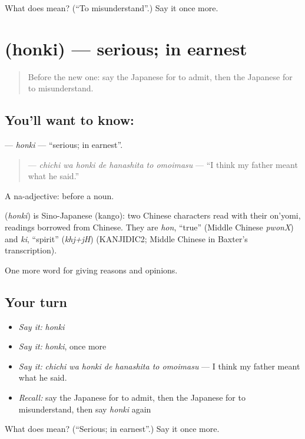 \begin{tcolorbox}[breakable,colback=teal!4,colframe=teal!35!black,title={Before you move on}]
What does  mean? (\textquotedblleft{}To misunderstand\textquotedblright{}.) Say it once more.
\end{tcolorbox}
\section[\texorpdfstring{\ja{ほんき} (honki)}{ほんき (honki)}]{ (honki) — serious; in earnest}

\label{lesson:JA-C319-honki}



\begin{quote}
Before the new one: say the Japanese for to admit, then the Japanese for to misunderstand.
\end{quote}

\subsection*{You'll want to know: }
\textbf{} — \emph{honki} — \textquotedblleft{}serious; in earnest\textquotedblright{}.

\begin{quote}
\textbf{   } — \emph{chichi wa honki de hanashita to omoimasu} — \textquotedblleft{}I think my father meant what he said.\textquotedblright{}
\end{quote}

A na-adjective:  before a noun.

\begin{cousinweb}
\textbf{} (\emph{honki}) is Sino-Japanese (kango): two Chinese characters read with their on'yomi, readings borrowed from Chinese. They are \emph{hon}, \textquotedblleft{}true\textquotedblright{} (Middle Chinese \emph{pwonX}) and \emph{ki}, \textquotedblleft{}spirit\textquotedblright{} (\emph{khj+jH}) (KANJIDIC2; Middle Chinese in Baxter's transcription).
\end{cousinweb}

\begin{grammarlens}[title={What you've built}]
One more word for giving reasons and opinions.
\end{grammarlens}

\subsection*{Your turn}
\begin{itemize}
\raggedright
  \item \emph{Say it:} \emph{honki}
  \item \emph{Say it:} \emph{honki}, once more
  \item \emph{Say it:} \emph{chichi wa honki de hanashita to omoimasu} — I think my father meant what he said.
  \item \emph{Recall:} say the Japanese for to admit, then the Japanese for to misunderstand, then say \emph{honki} again
\end{itemize}

\begin{tcolorbox}[breakable,colback=teal!4,colframe=teal!35!black,title={Before you move on}]
What does  mean? (\textquotedblleft{}Serious; in earnest\textquotedblright{}.) Say it once more.
\end{tcolorbox}
